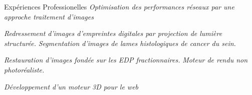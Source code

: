 \vspace{-.5cm}
\begin{rubric}{Expériences Professionelles}
\entry*[2011-]
\textit{Optimisation des performances réseaux par une approche traitement d'images}

\entry*[2010-2011]
\textit{Redressement d'images d'empreintes digitales par projection de lumière structurée.}
\entry*[2009-2010]
\textit{Segmentation d'images de lames histologiques de cancer du sein.}
 
\entry*[03-09 2003] 
\textit{Restauration d'images fondée sur les EDP fractionnaires.}
\entry*[07-09 2002]
\textit{Moteur de rendu non photoréaliste.}

\entry*[06-11 2001]
\textit{Développement d'un moteur 3D pour le web}

\end{rubric}
